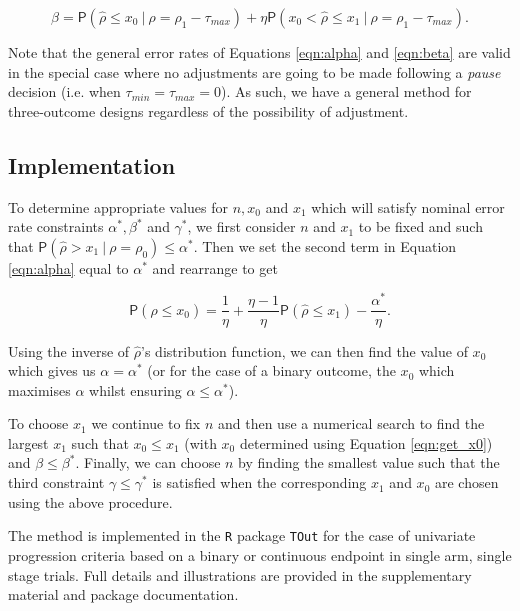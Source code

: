 \documentclass{bmcart}
\newcommand{\PR}{{\mathsf P}}
\begin{document}
\begin{equation}\label{eqn:beta}
\beta = \PR(\hat{\rho} \leq x_0 ~|~ \rho = \rho_1 - \tau_{max}) + \eta \PR(x_0 < \hat{\rho} \leq x_1 ~|~ \rho = \rho_1 - \tau_{max}).
\end{equation}

Note that the general error rates of Equations \ref{eqn:alpha} and \ref{eqn:beta} are valid in the special case where no adjustments are going to be made following a \emph{pause} decision (i.e. when $\tau_{min} = \tau_{max} = 0$). As such, we have a general method for three-outcome designs regardless of the possibility of adjustment. 

\subsection{Implementation}

To determine appropriate values for $n, x_0$ and $x_1$ which will satisfy nominal error rate constraints $\alpha^*, \beta^*$ and $\gamma^*$, we first consider $n$ and $x_1$ to be fixed and such that $\PR(\hat{\rho} > x_1 ~|~ \rho = \rho_0) \leq \alpha^*$. Then we set the second term in Equation \ref{eqn:alpha} equal to $\alpha^*$ and rearrange to get

\begin{equation}\label{eqn:get_x0}
\PR(\hat{\rho} \leq x_0) = \frac{1}{\eta} + \frac{\eta - 1}{\eta}\PR(\hat{\rho} \leq x_1) - \frac{\alpha^*}{\eta}.
\end{equation}

Using the inverse of $\hat{\rho}$'s distribution function, we can then find the value of $x_0$ which gives us $\alpha = \alpha^*$ (or for the case of a binary outcome, the $x_0$ which maximises $\alpha$ whilst ensuring $\alpha \leq \alpha^*$).

To choose $x_1$ we continue to fix $n$ and then use a numerical search to find the largest $x_1$ such that $x_0 \leq x_1$ (with $x_0$ determined using Equation \ref{eqn:get_x0}) and $\beta \leq \beta^*$. Finally, we can choose $n$ by finding the smallest value such that the third constraint $\gamma \leq \gamma^*$ is satisfied when the corresponding $x_1$ and $x_0$ are chosen using the above procedure.

The method is implemented in the \texttt{R} package \texttt{TOut} for the case of univariate progression criteria based on a binary or continuous endpoint in single arm, single stage trials. Full details and illustrations are provided in the supplementary material and package documentation.
\end{document}
